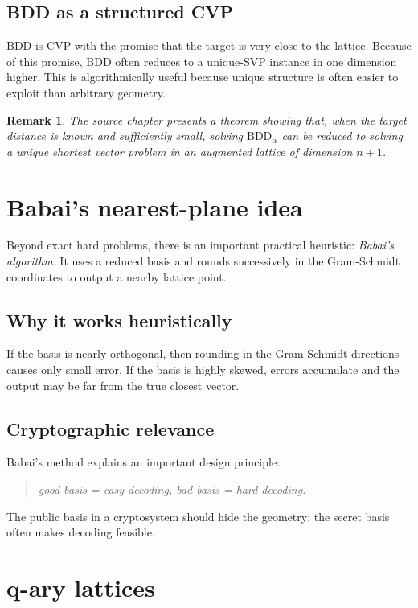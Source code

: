 \documentclass[11pt]{article}
\newtheorem{remark}[theorem]{Remark}
\begin{document}
\subsection{BDD as a structured CVP}
BDD is CVP with the promise that the target is very close to the lattice. Because of this promise, BDD often reduces to a unique-SVP instance in one dimension higher. This is algorithmically useful because unique structure is often easier to exploit than arbitrary geometry.

\begin{remark}
The source chapter presents a theorem showing that, when the target distance is known and sufficiently small, solving $\mathrm{BDD}_\alpha$ can be reduced to solving a unique shortest vector problem in an augmented lattice of dimension $n+1$.
\end{remark}

\section{Babai's nearest-plane idea}

Beyond exact hard problems, there is an important practical heuristic: \emph{Babai's algorithm}. It uses a reduced basis and rounds successively in the Gram-Schmidt coordinates to output a nearby lattice point.

\subsection{Why it works heuristically}
If the basis is nearly orthogonal, then rounding in the Gram-Schmidt directions causes only small error. If the basis is highly skewed, errors accumulate and the output may be far from the true closest vector.

\subsection{Cryptographic relevance}
Babai's method explains an important design principle:
\begin{quote}
\emph{good basis = easy decoding, bad basis = hard decoding.}
\end{quote}
The public basis in a cryptosystem should hide the geometry; the secret basis often makes decoding feasible.

\section{q-ary lattices}
\end{document}
